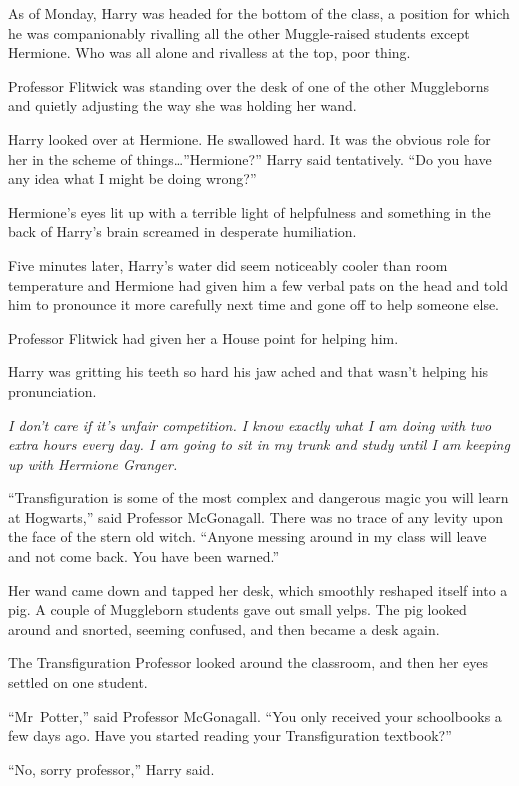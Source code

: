 As of Monday, Harry was headed for the bottom of the class, a position for
which he was companionably rivalling all the other Muggle-raised students
except Hermione. Who was all alone and rivalless at the top, poor thing.

Professor Flitwick was standing over the desk of one of the other Muggleborns
and quietly adjusting the way she was holding her wand.

Harry looked over at Hermione. He swallowed hard. It was the obvious role for
her in the scheme of things…”Hermione?” Harry said tentatively. “Do you
have any idea what I might be doing wrong?”

Hermione’s eyes lit up with a terrible light of helpfulness and something in
the back of Harry’s brain screamed in desperate humiliation.

Five minutes later, Harry’s water did seem noticeably cooler than room
temperature and Hermione had given him a few verbal pats on the head and told
him to pronounce it more carefully next time and gone off to help someone else.

Professor Flitwick had given her a House point for helping him.

Harry was gritting his teeth so hard his jaw ached and that wasn’t helping his
pronunciation.

\emph{I don’t care if it’s unfair competition. I know exactly what I am doing
with two extra hours every day. I am going to sit in my trunk and study until I
am keeping up with Hermione Granger.}

\later

“Transfiguration is some of the most complex and dangerous magic you will learn
at Hogwarts,” said Professor McGonagall. There was no trace of any levity upon
the face of the stern old witch. “Anyone messing around in my class will leave
and not come back. You have been warned.”

Her wand came down and tapped her desk, which smoothly reshaped itself into a
pig. A couple of Muggleborn students gave out small yelps. The pig looked
around and snorted, seeming confused, and then became a desk again.

The Transfiguration Professor looked around the classroom, and then her eyes
settled on one student.

“Mr~Potter,” said Professor McGonagall. “You only received your schoolbooks a
few days ago. Have you started reading your Transfiguration textbook?”

“No, sorry professor,” Harry said.

